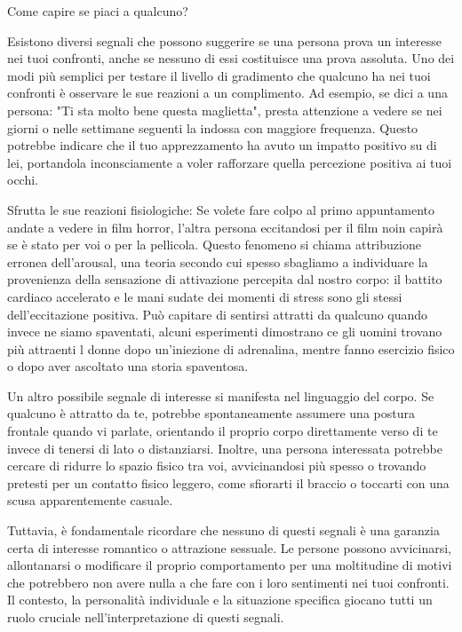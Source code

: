 \documentclass[12pt]{book} %
\begin{document}
\begin{mdframed}[linewidth=1pt]
Come capire se piaci a qualcuno?

Esistono diversi segnali che possono suggerire se una persona prova un interesse nei tuoi confronti, anche se nessuno di essi costituisce una prova assoluta. Uno dei modi più semplici per testare il livello di gradimento che qualcuno ha nei tuoi confronti è osservare le sue reazioni a un complimento. Ad esempio, se dici a una persona: "Ti sta molto bene questa maglietta", presta attenzione a vedere se nei giorni o nelle settimane seguenti la indossa con maggiore frequenza. Questo potrebbe indicare che il tuo apprezzamento ha avuto un impatto positivo su di lei, portandola inconsciamente a voler rafforzare quella percezione positiva ai tuoi occhi.

Sfrutta le sue reazioni fisiologiche: Se volete fare colpo al primo appuntamento andate a vedere in film horror,
l'altra persona eccitandosi per il film noin capirà se è stato per voi o per la pellicola. Questo fenomeno si chiama
attribuzione erronea dell'arousal, una teoria secondo cui spesso sbagliamo a individuare la provenienza della
sensazione di attivazione percepita dal nostro corpo: il battito cardiaco accelerato e le mani sudate dei momenti di
stress sono gli stessi dell'eccitazione positiva. Può capitare di sentirsi attratti da qualcuno quando invece ne siamo
spaventati, alcuni esperimenti dimostrano ce gli uomini trovano più attraenti l donne dopo un'iniezione di
adrenalina, mentre fanno esercizio fisico o dopo aver
ascoltato una storia spaventosa.

Un altro possibile segnale di interesse si manifesta nel linguaggio del corpo. Se qualcuno è attratto da te, potrebbe spontaneamente assumere una postura frontale quando vi parlate, orientando il proprio corpo direttamente verso di te invece di tenersi di lato o distanziarsi. Inoltre, una persona interessata potrebbe cercare di ridurre lo spazio fisico tra voi, avvicinandosi più spesso o trovando pretesti per un contatto fisico leggero, come sfiorarti il braccio o toccarti con una scusa apparentemente casuale.

Tuttavia, è fondamentale ricordare che nessuno di questi segnali è una garanzia certa di interesse romantico o attrazione sessuale. Le persone possono avvicinarsi, allontanarsi o modificare il proprio comportamento per una moltitudine di motivi che potrebbero non avere nulla a che fare con i loro sentimenti nei tuoi confronti. Il contesto, la personalità individuale e la situazione specifica giocano tutti un ruolo cruciale nell’interpretazione di questi segnali.
\end{mdframed}
\end{document}
